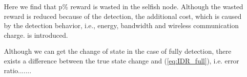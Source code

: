 Here we find that p\% reward is wasted in the selfish node.
Although the wasted reward is reduced because of the detection,
the additional cost,
which is caused by the detection behavior,
i.e., energy, bandwidth and wireless communication charge.
is introduced.

Although we can get the change of state in the case of fully detection,
there exists a difference between the true state change and (\ref{eq:IDR_full}),
i.e. error ratio.......
